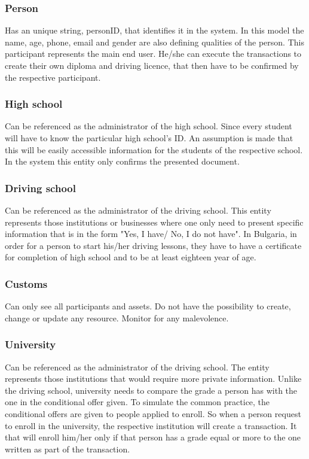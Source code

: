 \documentclass[a4paper,11pt]{report}
\begin{document}
\subsubsection{Person}
Has an unique string, personID, that identifies it in the system. In this model the name, age, phone, email and gender are also defining qualities of the person. This participant represents the main end user. He/she can execute the transactions to create their own diploma and driving licence, that then have to be confirmed by the respective participant.   

\subsubsection{High school}
Can be referenced as the administrator of the high school. Since every student will have to know the particular high school's ID. An assumption is made that this will be easily accessible information for the students of the respective school. In the system this entity only confirms the presented document. 

\subsubsection{Driving school}	
Can be referenced as the administrator of the driving school. This entity represents those institutions or businesses where one only need to present specific information that is in the form "Yes, I have/ No, I do not have". In Bulgaria, in order for a person to start his/her driving lessons, they have to have a certificate for completion of high school and to be at least eighteen year of age. 
	
\subsubsection{Customs}
Can only see all participants and assets. Do not have the possibility to create, change or update any resource. Monitor for any malevolence.

\subsubsection{University}
Can be referenced as the administrator of the driving school. The entity represents those institutions that would require more private information. Unlike the driving school, university needs to compare the grade a person has with the one in the conditional offer given. To simulate the common practice, the conditional offers are given to people applied to enroll. So when a person request to enroll in the university, the respective institution will create a transaction. It that will enroll him/her only if that person has a grade equal or more to the one written as part of the transaction. 
	
\end{document}

